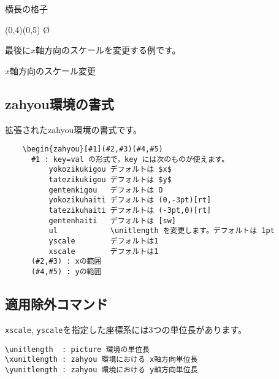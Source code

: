 \documentclass[a4j]{jarticle}
\begin{document}
\begin{showEx}{横長の格子}
\begin{zahyou*}[ul=3mm,xscale=3,%
  yscale=2](0,4)(0,5)%
  \Put\O{}%
\end{zahyou*}%
\end{showEx}

最後に$x$軸方向のスケールを変更する例です。

\begin{showEx}{$x$軸方向のスケール変更}
\xs
{}
\end{showEx}

\subsection{\textsf{zahyou}環境の書式}
拡張された\textsf{zahyou}環境の書式です。

\begin{boxnote}
\begin{verbatim}
    \begin{zahyou}[#1](#2,#3)(#4,#5)
      #1 : key=val の形式で，key には次のものが使えます。
          yokozikukigou デフォルトは $x$
          tatezikukigou デフォルトは $y$
          gentenkigou   デフォルトは O
          yokozikuhaiti デフォルトは (0,-3pt)[rt]
          tatezikuhaiti デフォルトは (-3pt,0)[rt]
          gentenhaiti   デフォルトは [sw]
          ul            \unitlength を変更します。デフォルトは 1pt
          yscale        デフォルトは1
          xscale        デフォルトは1
      (#2,#3) : xの範囲
      (#4,#5) : yの範囲
\end{verbatim}
\end{boxnote}

\subsection{適用除外コマンド}
\texttt{xscale}, \texttt{yscale}を指定した座標系には3つの単位長があります。
\begin{jquote}
\begin{verbatim}
\unitlength  : picture 環境の単位長
\xunitlength : zahyou 環境における x軸方向単位長
\yunitlength : zahyou 環境における y軸方向単位長
\end{verbatim}
\end{jquote}
\end{document}
